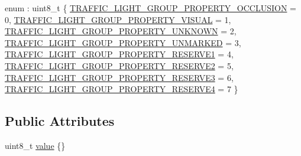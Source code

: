 \begin{DoxyCompactItemize}
\item 
enum \+: uint8\+\_\+t \{ \newline
\hyperlink{structmaf__perception__interface_1_1TrafficLightGroupPropertyEnum_a2e67b35f31610c6dc78afbcd9f8cacdaa01468b860866cc2fa47c7e7785d8d4d3}{T\+R\+A\+F\+F\+I\+C\+\_\+\+L\+I\+G\+H\+T\+\_\+\+G\+R\+O\+U\+P\+\_\+\+P\+R\+O\+P\+E\+R\+T\+Y\+\_\+\+O\+C\+C\+L\+U\+S\+I\+ON} = 0, 
\hyperlink{structmaf__perception__interface_1_1TrafficLightGroupPropertyEnum_a2e67b35f31610c6dc78afbcd9f8cacdaa8a4bd30a0d4996ad76cf48989a71485f}{T\+R\+A\+F\+F\+I\+C\+\_\+\+L\+I\+G\+H\+T\+\_\+\+G\+R\+O\+U\+P\+\_\+\+P\+R\+O\+P\+E\+R\+T\+Y\+\_\+\+V\+I\+S\+U\+AL} = 1, 
\hyperlink{structmaf__perception__interface_1_1TrafficLightGroupPropertyEnum_a2e67b35f31610c6dc78afbcd9f8cacdaa164d9b65cccc80afa6050e32610a2ce6}{T\+R\+A\+F\+F\+I\+C\+\_\+\+L\+I\+G\+H\+T\+\_\+\+G\+R\+O\+U\+P\+\_\+\+P\+R\+O\+P\+E\+R\+T\+Y\+\_\+\+U\+N\+K\+N\+O\+WN} = 2, 
\hyperlink{structmaf__perception__interface_1_1TrafficLightGroupPropertyEnum_a2e67b35f31610c6dc78afbcd9f8cacdaad8837d3d392dd8eed48fffa262ebca86}{T\+R\+A\+F\+F\+I\+C\+\_\+\+L\+I\+G\+H\+T\+\_\+\+G\+R\+O\+U\+P\+\_\+\+P\+R\+O\+P\+E\+R\+T\+Y\+\_\+\+U\+N\+M\+A\+R\+K\+ED} = 3, 
\newline
\hyperlink{structmaf__perception__interface_1_1TrafficLightGroupPropertyEnum_a2e67b35f31610c6dc78afbcd9f8cacdaaff2104d977afa1ae93ed4c166e963edf}{T\+R\+A\+F\+F\+I\+C\+\_\+\+L\+I\+G\+H\+T\+\_\+\+G\+R\+O\+U\+P\+\_\+\+P\+R\+O\+P\+E\+R\+T\+Y\+\_\+\+R\+E\+S\+E\+R\+V\+E1} = 4, 
\hyperlink{structmaf__perception__interface_1_1TrafficLightGroupPropertyEnum_a2e67b35f31610c6dc78afbcd9f8cacdaab7df48abd6f5937bbb40e8bdcd7e0490}{T\+R\+A\+F\+F\+I\+C\+\_\+\+L\+I\+G\+H\+T\+\_\+\+G\+R\+O\+U\+P\+\_\+\+P\+R\+O\+P\+E\+R\+T\+Y\+\_\+\+R\+E\+S\+E\+R\+V\+E2} = 5, 
\hyperlink{structmaf__perception__interface_1_1TrafficLightGroupPropertyEnum_a2e67b35f31610c6dc78afbcd9f8cacdaac76ea472b0e3476f13bcecc6825d9565}{T\+R\+A\+F\+F\+I\+C\+\_\+\+L\+I\+G\+H\+T\+\_\+\+G\+R\+O\+U\+P\+\_\+\+P\+R\+O\+P\+E\+R\+T\+Y\+\_\+\+R\+E\+S\+E\+R\+V\+E3} = 6, 
\hyperlink{structmaf__perception__interface_1_1TrafficLightGroupPropertyEnum_a2e67b35f31610c6dc78afbcd9f8cacdaa6a907cc1b684d7113502af85dd5434be}{T\+R\+A\+F\+F\+I\+C\+\_\+\+L\+I\+G\+H\+T\+\_\+\+G\+R\+O\+U\+P\+\_\+\+P\+R\+O\+P\+E\+R\+T\+Y\+\_\+\+R\+E\+S\+E\+R\+V\+E4} = 7
 \}
\end{DoxyCompactItemize}
\subsection*{Public Attributes}
\begin{DoxyCompactItemize}
\item 
uint8\+\_\+t \hyperlink{structmaf__perception__interface_1_1TrafficLightGroupPropertyEnum_a6e09e65cbe0e627eb690e77550f1a723}{value} \{\}
\end{DoxyCompactItemize}


